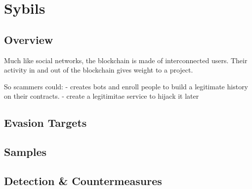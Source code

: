 \section{Sybils} \label{sec:sybils}

\subsection{Overview}

Much like social networks, the blockchain is made of interconnected users.
Their activity in and out of the blockchain gives weight to a project.

So scammers could:
- creates bots and enroll people to build a legitimate history on their contracts.
- create a legitimitae service to hijack it later

\subsection{Evasion Targets}

\subsection{Samples}

\subsection{Detection \& Countermeasures}

